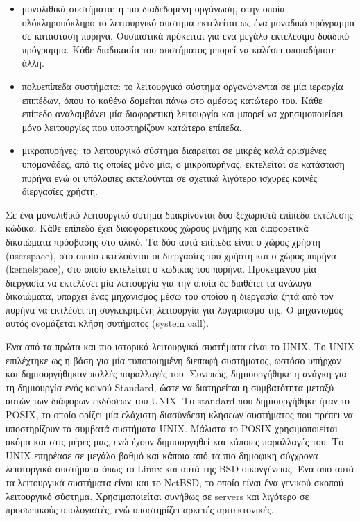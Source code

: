 \begin{itemize}
	\item μονολιθικά συστήματα: η πιο διαδεδομένη οργάνωση, στην οποία
		ολόκληρουόκληρο το λειτουργικό συστημα εκτελείται ως ένα
		μοναδικό πρόγραμμα σε κατάσταση πυρήνα. Ουσιαστικά πρόκειται για
		ένα μεγάλο εκτελέσιμο δυαδικό πρόγραμμα. Κάθε διαδικασία του
		συστήματος μπορεί να καλέσει οποιαδήποτε άλλη. 
	\item πολυεπίπεδα συστήματα: το λειτουργικό σύστημα οργανώνενται σε μία
		ιεραρχία επιπέδων, όπου το καθένα δομείται πάνω στο αμέσως
		κατώτερο του. Κάθε επίπεδο αναλαμβάνει μία διαφορετική
		λειτουργία και μπορεί να χρησιμοποιείσει μόνο λειτουργίες που
		υποστηρίζουν κατώτερα επίπεδα.
	\item μικροπυρήνες: το λειτουργικό σύστημα διαιρείται σε μικρές καλά
		ορισμένες υπομονάδες, από τις οποίες μόνο μία, ο μικροπυρήνας,
		εκτελείται σε κατάσταση πυρήνα ενώ οι υπόλοιπες εκτελούνται σε
		σχετικά λιγότερο ισχυρές κοινές διεργασίες χρήστη.
\end{itemize}

Σε ένα μονολιθικό λειτουργικό συτημα διακρίνονται δύο ξεχωριστά επίπεδα
εκτέλεσης κώδικα. Κάθε επίπεδο έχει διαοφορετικούς χώρους μνήμης και διαφορετικά
δικαιώματα πρόσβασης στο υλικό. Τα δύο αυτά επίπεδα είναι ο χώρος χρήστη
(userspace), στο οποίο εκτελούνται οι διεργασίες του χρήστη και ο χώρος πυρήνα
(kernelspace), στο οποίο εκτελείται ο κώδικας του πυρήνα. Προκειμένου μία
διεργασία να εκτελέσει μία λειτουργία για την οποία δε διαθέτει τα ανάλογα
δικαιώματα, υπάρχει ένας μηχανισμός μέσω του οποίου η διεργασία ζητά από τον
πυρήνα να εκτλέσει τη συγκεκριμένη λειτουργία για λογαριασμό της. Ο μηχανισμός
αυτός ονομάζεται κλήση συτήματος (system call). 


Ένα από τα πρώτα και πιο ιστορικά λειτουργικά συστήματα είναι το UNIX. Το UNIX
επιλέχτηκε ως η βάση για μία τυποποιημένη διεπαφή συστήματος, ωστόσο υπήρχαν και
δημιουργήθηκαν πολλές παραλλαγές του. Συνεπώς, δημιουργήθηκε η ανάγκη για τη
δημιουργία ενός κοινού Standard, ώστε να διατηρείται η συμβατότητα μεταξύ αυτών
των διάφορων εκδόσεων του UNIX. Το standard που δημιουργήθηκε ήταν το POSIX, το
οποίο ορίζει μία ελάχιστη διασύνδεση κλήσεων συστήματος που πρέπει να
υποστηρίζουν τα συμβατά συστήματα UNIX. Μάλιστα το POSIX χρησιμοποιείται ακόμα
και στις μέρες μας, ενώ έχουν δημιουργηθεί και κάποιες παραλλαγές του. Το UNIX
επηρέασε σε μεγάλο βαθμό και κάποια από τα πιο δημοφικη σύγχρονα λειοτυργικά
συστήματα όπως το Linux και αυτά της BSD οικονγένειας. Ένα από αυτά τα
λειτουργικά συστήματα είναι και το NetBSD, το οποίο είναι ένα γενικού σκοπού
λειτουργικό σύστημα. Χρησιμοποιείται συνήθως σε servers και λιγότερο σε
προσωπικούς υπολογιστές, ενώ υποστηρίζει αρκετές αριτεκτονικές. 


